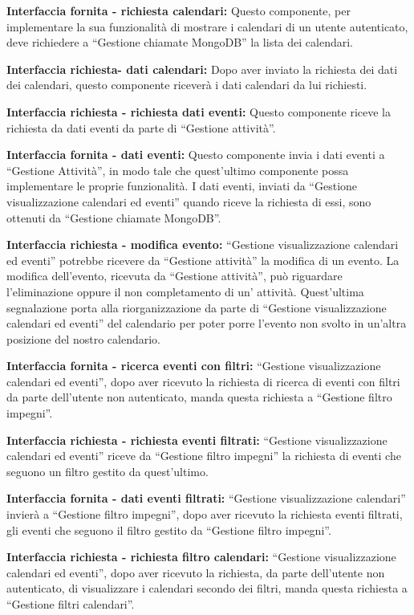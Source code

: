 \begin{listaPersonale}[DCI]{}
    \textbf{Interfaccia fornita - richiesta calendari:} Questo componente, per implementare la sua funzionalità di mostrare i calendari di un utente autenticato, deve richiedere a “Gestione chiamate MongoDB” la lista dei calendari.

    \textbf{Interfaccia richiesta- dati calendari:} Dopo aver inviato la richiesta dei dati dei calendari, questo componente riceverà i dati calendari da lui richiesti.

    \textbf{Interfaccia richiesta - richiesta dati eventi:} Questo componente riceve la richiesta da dati eventi da parte di “Gestione attività”.

    \textbf{Interfaccia fornita - dati eventi:} Questo componente invia i dati eventi a “Gestione Attività”, in modo tale che quest'ultimo componente possa implementare le proprie funzionalità. I dati eventi, inviati da “Gestione visualizzazione calendari ed eventi” quando riceve la richiesta di essi, sono ottenuti da “Gestione chiamate MongoDB”.

    \textbf{Interfaccia richiesta - modifica evento:} “Gestione visualizzazione calendari ed eventi” potrebbe ricevere da “Gestione attività” la modifica di un evento. La modifica dell'evento, ricevuta da “Gestione attività”, può riguardare l'eliminazione oppure il non completamento di un' attività. Quest'ultima segnalazione porta alla riorganizzazione da parte di “Gestione visualizzazione calendari ed eventi” del calendario per poter porre l'evento non svolto in un'altra posizione del nostro calendario.

    \textbf{Interfaccia fornita - ricerca eventi con filtri:} “Gestione visualizzazione calendari ed eventi”, dopo aver ricevuto la richiesta di ricerca di eventi con filtri da parte dell'utente non autenticato, manda questa richiesta a “Gestione filtro impegni”.

    \textbf{Interfaccia richiesta - richiesta eventi filtrati:} “Gestione visualizzazione calendari ed eventi” riceve da “Gestione filtro impegni” la richiesta di eventi che seguono un filtro gestito da quest'ultimo.

    \textbf{Interfaccia fornita - dati eventi filtrati:} “Gestione visualizzazione calendari” invierà  a “Gestione filtro impegni”, dopo aver ricevuto la richiesta eventi filtrati, gli eventi che seguono il filtro gestito da “Gestione filtro impegni”.

    \textbf{Interfaccia richiesta - richiesta filtro calendari:} “Gestione visualizzazione calendari ed eventi”, dopo aver ricevuto la richiesta, da parte dell'utente non autenticato, di visualizzare i calendari secondo dei filtri, manda questa richiesta a “Gestione filtri calendari”.


\end{listaPersonale}
